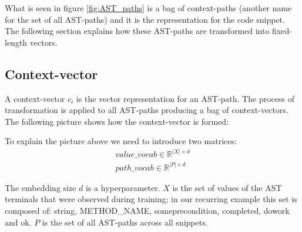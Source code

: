 
What is seen in figure \ref{fig:AST_paths} is a bag of context-paths (another name for the set of all AST-paths) and it is the representation for the code snippet. The following section explains how these AST-paths are transformed into fixed-length vectors.

\subsection{Context-vector}

A context-vector $c_i$ is the vector representation for an AST-path. The process of transformation is applied to all AST-paths producing a bag of context-vectors.
The following picture shows how the context-vector is formed:

\begin{center}
\end{center}

To explain the picture above we need to introduce two matrices:
\begin{align*} 
 value\_vocab \in \mathbb{R}^{|X| \times d}
\\
    path\_vocab \in \mathbb{R}^{|P| \times d}
\end{align*}

The embedding size $d$ is a hyperparameter. $X$ is the set of values of the AST terminals that were observed during training; in our recurring example this set is composed of: string, METHOD\_NAME, someprecondition, completed, dowork and ok. 
$P$ is the set of all AST-paths across all snippets.

